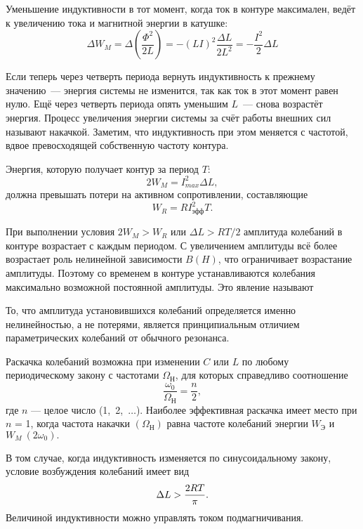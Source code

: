Уменьшение индуктивности в тот момент, когда ток в контуре максимален, ведёт к
увеличению тока и магнитной энергии в катушке:
\begin{equation*}
	\Delta W_M = \Delta \left(\frac{\Phi^2}{2L}\right) = - (LI)^2\frac{\Delta
L}{2L^2} = - \frac{I^2}{2}\Delta L
\end{equation*}

Если теперь через четверть периода вернуть индуктивность к прежнему значению~---
энергия системы не изменится, так как ток в этот момент равен нулю. Ещё через
четверть периода опять уменьшим $L$~--- снова возрастёт энергия. Процесс
увеличения энергии системы за счёт работы внешних сил называют накачкой.
Заметим, что индуктивность при этом меняется с частотой, вдвое превосходящей
собственную частоту контура.

Энергия, которую получает контур за период $T$:
\begin{equation*}
	2W_M = I^2_{max} \Delta L,
\end{equation*}
должна превышать потери на активном сопротивлении, составляющие
\begin{equation*}
	W_R = RI^2_\text{эфф}T.
\end{equation*}

При выполнении условия $2W_M > W_R$ или $\Delta L > RT/2$ амплитуда колебаний в
контуре возрастает с каждым периодом. С увеличением амплитуды всё более
возрастает роль нелинейной зависимости $B(H)$, что ограничивает возрастание
амплитуды. Поэтому со временем в контуре устанавливаются колебания максимально
возможной постоянной амплитуды. Это явление называют 

То, что амплитуда установившихся колебаний определяется именно нелинейностью, а
не потерями, является принципиальным отличием параметрических колебаний от
обычного резонанса.

Раскачка колебаний возможна при изменении $C$ или $L$ по любому периодическому
закону с частотами $\Omega_\text{Н}$, для которых справедливо соотношение
\begin{equation*}
	\frac{\omega_0}{\Omega_\text{Н}} = \frac{n}{2},
\end{equation*}
где $n$ --- целое число (1,~2,~$\dots$). Наиболее эффективная раскачка имеет
место при $n$ = 1, когда частота накачки $(\Omega_\text{Н})$ равна частоте
колебаний энергии $W_\text{Э}$ и $W_M~(2\omega_0).$

 В том случае, когда индуктивность изменяется по синусоидальному закону, условие
возбуждения колебаний имеет вид
\begin{equation}
	\eqmark{4.6.3}
	\Delta L > \frac{2RT}{\pi}.
\end{equation}
Величиной индуктивности можно управлять током подмагничивания.

